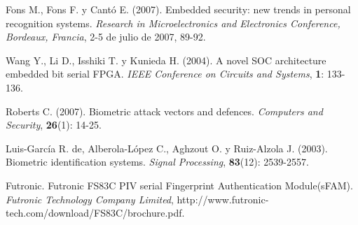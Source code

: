 \begin{thebibliography}{00}
Fons M., Fons F. y Cant\'o E. (2007).
\newblock Embedded security: new trends in personal recognition systems.
\newblock \emph{Research in Microelectronics and Electronics Conference, Bordeaux, Francia}, 2-5  de julio de 2007, 89-92.

Wang Y., Li D., Isshiki T. y Kunieda H. (2004).
\newblock A novel SOC architecture embedded bit serial FPGA.
\newblock \emph{IEEE Conference on Circuits and Systems}, \textbf{1}: 133-136.

Roberts C. (2007).
\newblock Biometric attack vectors and defences.
\newblock \emph{Computers and Security}, \textbf{26}(1): 14-25.

Luis-García R. de, Alberola-López C., Aghzout O. y Ruiz-Alzola J. (2003).
\newblock Biometric identification systems.
\newblock \emph{Signal Processing}, \textbf{83}(12): 2539-2557.

Futronic.
\newblock Futronic FS83C PIV serial Fingerprint Authentication Module(sFAM).
\newblock \emph{Futronic Technology Company Limited}, http://www.futronic-tech.com/download/FS83C/brochure.pdf.


\end{thebibliography}